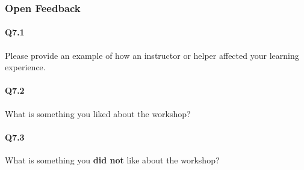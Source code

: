\documentclass[030-workshop.tex]{subfiles}
\begin{document}
\subsubsection{Open Feedback}

    \paragraph{Q7.1}

        Please provide an example of how an instructor or helper affected your learning experience.

    \paragraph{Q7.2}

        What is something you liked about the workshop?

    \paragraph{Q7.3}

        What is something you \textbf{did not} like about the workshop?
\end{document}
